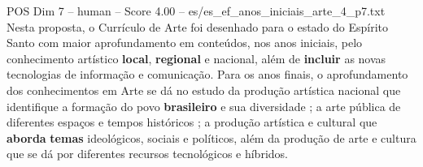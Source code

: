 \begin{textsample}{POS Dim 7 – human – Score 4.00 – es/es\_ef\_anos\_iniciais\_arte\_4\_p7.txt}  \label{ex:f7_pos_007}
Nesta proposta, o Currículo de Arte foi desenhado para o estado do Espírito Santo com maior aprofundamento em conteúdos, nos anos iniciais, pelo conhecimento artístico \textbf{local}, \textbf{regional} e nacional, além de \textbf{incluir} as novas tecnologias de informação e comunicação.
Para os anos finais, o aprofundamento dos conhecimentos em Arte se dá no estudo da produção artística nacional que identifique a formação do povo \textbf{brasileiro} e sua diversidade ; a arte pública de diferentes espaços e tempos históricos ; a produção artística e cultural que \textbf{aborda} \textbf{temas} ideológicos, sociais e políticos, além da produção de arte e cultura que se dá por diferentes recursos tecnológicos e híbridos.

\end{textsample}
